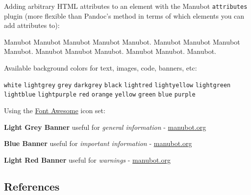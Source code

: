 Adding arbitrary HTML attributes to an element with the Manubot \texttt{attributes} plugin (more flexible than Pandoc's method in terms of which elements you can add attributes to):

Manubot Manubot Manubot Manubot Manubot.
Manubot Manubot Manubot Manubot.
Manubot Manubot Manubot.
Manubot Manubot.
Manubot.

Available background colors for text, images, code, banners, etc:

\texttt{white}
\texttt{lightgrey}
\texttt{grey}
\texttt{darkgrey}
\texttt{black}
\texttt{lightred}
\texttt{lightyellow}
\texttt{lightgreen}
\texttt{lightblue}
\texttt{lightpurple}
\texttt{red}
\texttt{orange}
\texttt{yellow}
\texttt{green}
\texttt{blue}
\texttt{purple}

Using the \href{https://fontawesome.com/}{Font Awesome} icon set:

{ \textbf{Light Grey Banner}
useful for \emph{general information} - \href{https://manubot.org/}{manubot.org}}

{ \textbf{Blue Banner}
useful for \emph{important information} - \href{https://manubot.org/}{manubot.org}}

{ \textbf{Light Red Banner}
useful for \emph{warnings} - \href{https://manubot.org/}{manubot.org}}

\hypertarget{references}{%
\subsection{References}\label{references}}

